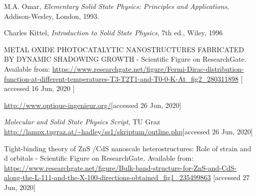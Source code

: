 \begin{thebibliography}{9}
    M.A. Omar, \textit{Elementary Solid State Physics:  
    Principles and Applications}, 
    Addison-Wesley, London, 1993.
    
    Charles Kittel, \textit{Introduction to Solid State Physics}, 7th ed.,
    Wiley, 1996

    METAL OXIDE PHOTOCATALYTIC NANOSTRUCTURES FABRICATED BY DYNAMIC SHADOWING GROWTH - Scientific Figure on ResearchGate. Available from: 
    \url{https://www.researchgate.net/figure/Fermi-Dirac-distribution-function-at-different-temperatures-T3-T2T1-and-T0-0-K-At_fig2_280311898} 
    [ accessed 16 Jun, 2020 ]

    \url{http://www.optique-ingenieur.org/}[accessed 26 Jun, 2020]

    \textit{Molecular and Solid State Physics Script}, TU Graz 
    \url{http://lampx.tugraz.at/~hadley/ss1/skriptum/outline.php}[accessed 26 Jun, 2020]

    Tight-binding theory of ZnS \slash CdS nanoscale heterostructures: Role of strain and d orbitals - Scientific Figure on ResearchGate. Available from: 
    \url{https://www.researchgate.net/figure/Bulk-band-structure-for-ZnS-and-CdS-along-the-L-111-and-the-X-100-directions-obtained_fig1_235499863} 
    [accessed 27 Jun, 2020]

\end{thebibliography}